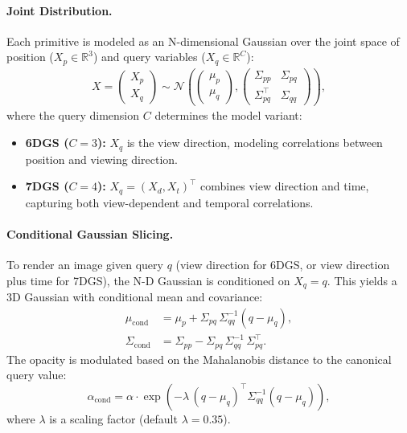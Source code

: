 \documentclass{article}
\begin{document}
\paragraph{Joint Distribution.} Each primitive is modeled as an N-dimensional Gaussian over the joint space of position (\(X_p \in \mathbb{R}^3\)) and query variables (\(X_q \in \mathbb{R}^C\)):
\begin{align}
X = \begin{pmatrix} X_p \\ X_q \end{pmatrix} \sim \mathcal{N}\!\left(
\begin{pmatrix}
\mu_p \\ \mu_q
\end{pmatrix},
\begin{pmatrix}
\Sigma_{pp} & \Sigma_{pq} \\
\Sigma_{pq}^\top & \Sigma_{qq}
\end{pmatrix}
\right),
\end{align}
where the query dimension $C$ determines the model variant:
\begin{itemize}
\item \textbf{6DGS ($C=3$):} $X_q$ is the view direction, modeling correlations between position and viewing direction.
\item \textbf{7DGS ($C=4$):} $X_q = (X_d, X_t)^\top$ combines view direction and time, capturing both view-dependent and temporal correlations.
\end{itemize}

\paragraph{Conditional Gaussian Slicing.} To render an image given query $q$ (view direction for 6DGS, or view direction plus time for 7DGS), the N-D Gaussian is conditioned on $X_q = q$. This yields a 3D Gaussian with conditional mean and covariance:
\begin{align}
\mu_{\text{cond}} &= \mu_p + \Sigma_{pq}\,\Sigma_{qq}^{-1}(q-\mu_q), \\
\Sigma_{\text{cond}} &= \Sigma_{pp} - \Sigma_{pq}\,\Sigma_{qq}^{-1}\,\Sigma_{pq}^\top.
\end{align}
The opacity is modulated based on the Mahalanobis distance to the canonical query value:
\begin{equation}
\alpha_{\text{cond}} = \alpha \cdot \exp\left(-\lambda\,(q-\mu_q)^\top \Sigma_{qq}^{-1}(q-\mu_q)\right),
\end{equation}
where $\lambda$ is a scaling factor (default $\lambda = 0.35$).
\end{document}
